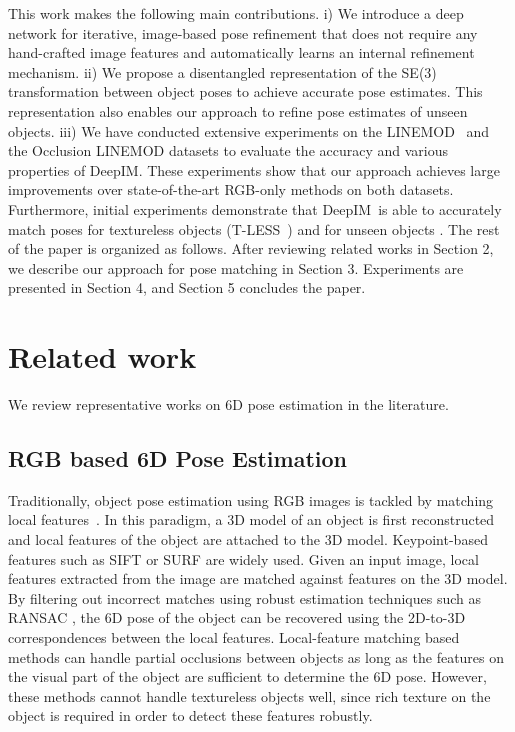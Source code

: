 \documentclass[twocolumn]{svjour3}
\newcommand{\dimnet}[0]{DeepIM}
\begin{document}
This work makes the following main contributions. i) We introduce a deep network for iterative, image-based pose refinement that does not require any hand-crafted image features and automatically learns an internal refinement mechanism. ii) We propose a disentangled representation of the SE(3) transformation between object poses to achieve accurate pose estimates. This representation also enables our approach to refine pose estimates of unseen objects. 
iii) We have conducted extensive experiments on the LINEMOD~\citep{hinterstoisser2012accv} and the Occlusion LINEMOD \citep{Brachmann2014Learning6O} datasets to evaluate the accuracy and various properties of \dimnet. These experiments show that our approach achieves large improvements over state-of-the-art RGB-only methods on both datasets. Furthermore, initial experiments demonstrate that \dimnet\ is able to accurately match poses for textureless objects (T-LESS~\citep{hodan2017t}) and for unseen objects \citep{wu20153d}. The rest of the paper is organized as follows. After reviewing related works in Section 2, we describe our approach for pose matching in Section 3. Experiments are presented in Section 4, and Section 5 concludes the paper.

\section{Related work}

We review representative works on 6D pose estimation in the literature.

\subsection{RGB based 6D Pose Estimation}

Traditionally, object pose estimation using RGB images is tackled by matching local features~\citep{lowe1999object,rothganger20063d,collet2011moped}. In this paradigm, a 3D model of an object is first reconstructed and local features of the object are attached to the 3D model. Keypoint-based features such as SIFT \citep{lowe1999object} or SURF \citep{bay2008speeded} are widely used. Given an input image, local features extracted from the image are matched against features on the 3D model. By filtering out incorrect matches using robust estimation techniques such as RANSAC \citep{nister2005preemptive}, the 6D pose of the object can be recovered using the 2D-to-3D correspondences between the local features. Local-feature matching based methods can handle partial occlusions between objects as long as the features on the visual part of the object are sufficient to determine the 6D pose. However, these methods cannot handle textureless objects well, since rich texture on the object is required in order to detect these features robustly.
\end{document}
